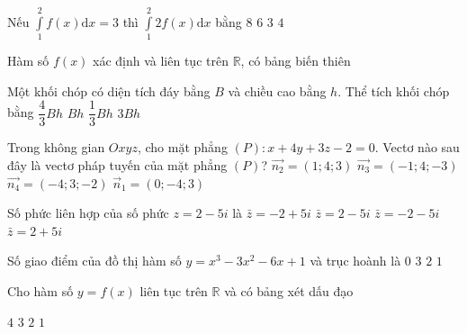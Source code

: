 \begin{ex}%
Nếu $\displaystyle\int\limits_1^2 f(x) \mathrm{d} x=3$ thì $\displaystyle\int\limits_1^2 2 f(x) \mathrm{d} x$ bằng
\choice
{$8$}
{\True $6$}
{$3$}
{$4$}

\end{ex}
\begin{ex}%
Hàm số $f(x)$ xác định và liên tục trên $\mathbb{R}$, có bảng biến thiên 
{

}

\end{ex}
\begin{ex}%
Một khối chóp có diện tích đáy bằng $B$ và chiều cao bằng $h$. Thể tích khối chóp bằng
\choice
{$\dfrac{4}{3} B h$}
{$B h$}
{\True $\dfrac{1}{3} B h$}
{$3 B h$}

\end{ex}
\begin{ex}%
Trong không gian $O x y z$, cho mặt phẳng $(P)\colon x+4 y+3 z-2=0$. Vectơ nào sau đây là vectơ pháp tuyến của mặt phẳng $(P)$?
\choice
{\True $\overrightarrow{n_2}=(1; 4; 3)$}
{$\overrightarrow{n_3}=(-1; 4;-3)$}
{$\overrightarrow{n_4}=(-4; 3;-2)$}
{$\vec{n}_1=(0;-4; 3)$}

\end{ex}
\begin{ex}%
Số phức liên hợp của số phức $z=2-5 i$ là
\choice
{$\bar{z}=-2+5 i$}
{$\bar{z}=2-5 i$}
{$\bar{z}=-2-5 i$}
{\True $\bar{z}=2+5 i$}

\end{ex}
\begin{ex}%
Số giao điểm của đồ thị hàm số $y=x^3-3 x^2-6 x+1$ và trục hoành là
\choice
{$0$}
{\True $3$}
{$2$}
{$1$}

\end{ex}
\begin{ex}%
Cho hàm số $y=f(x)$ liên tục trên $\mathbb{R}$ và có bảng xét dấu đạo 
{
}
\choice
{\True $4$}
{$3$}
{$2$}
{$1$}
\end{ex}
